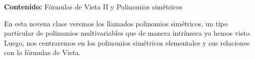 {\Large\textbf{Contenido:} Fórmulas de Vieta II y Polinomios simétricos}

En esta novena clase veremos los llamados polinomios simétricos, un tipo particular de polinomios multivariables que de manera intrínseca ya hemos visto.
Luego, nos centraremos en los polinomios simétricos elementales y sus relaciones con la fórmulas de Vieta.